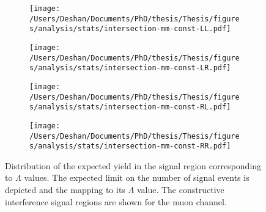 \begin{figure}[h!]
    \centering
    \begin{subfigure}[b]{0.49\textwidth}
        \centering
        \texttt{[image: /Users/Deshan/Documents/PhD/thesis/Thesis/figures/analysis/stats/intersection-mm-const-LL.pdf]}
        \label{fig:bkgmodel:interpmm1}
    \end{subfigure}
    \begin{subfigure}[b]{0.49\textwidth}
        \centering
        \texttt{[image: /Users/Deshan/Documents/PhD/thesis/Thesis/figures/analysis/stats/intersection-mm-const-LR.pdf]}
        \label{fig:bkgmodel:interpmm2}
    \end{subfigure}
    \begin{subfigure}[b]{0.49\textwidth}
        \centering
        \texttt{[image: /Users/Deshan/Documents/PhD/thesis/Thesis/figures/analysis/stats/intersection-mm-const-RL.pdf]}
        \label{fig:bkgmodel:interpmm3}
    \end{subfigure}
    \begin{subfigure}[b]{0.49\textwidth}
        \centering
        \texttt{[image: /Users/Deshan/Documents/PhD/thesis/Thesis/figures/analysis/stats/intersection-mm-const-RR.pdf]}
        \label{fig:bkgmodel:interpmm4}
    \end{subfigure}
    \caption{Distribution of the expected yield in the signal region corresponding to $\Lambda$ values. The expected limit on the number of signal events is depicted and the mapping to its $\Lambda$ value. The constructive interference signal regions are shown for the muon channel.}
    \label{fig:stats:interpmmconst}
\end{figure}

